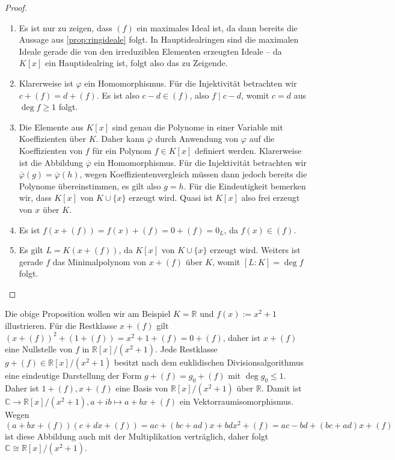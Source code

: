 \begin{proof}{\ }
    \begin{enumerate}
        \item Es ist nur zu zeigen, dass $(f)$ ein maximales Ideal ist, da dann bereits die Aussage aus \cref*{prop:ringideale} folgt. In Hauptidealringen sind die maximalen Ideale gerade die von den irreduziblen Elementen erzeugten Ideale -- da $K[x]$ ein Hauptidealring ist, folgt also das zu Zeigende.
        \item Klarerweise ist $\varphi$ ein Homomorphismus. Für die Injektivität betrachten wir $c + (f) = d + (f)$. Es ist also $c - d \in (f)$, also $f \mid c - d$, womit $c = d$ aus $\deg f\geq 1$ folgt.
        \item Die Elemente aus $K[x]$ sind genau die Polynome in einer Variable mit Koeffizienten über $K$. Daher kann $\overline{\varphi}$ durch Anwendung von $\varphi$ auf die Koeffizienten von $f$ für ein Polynom $f\in K[x]$ definiert werden. Klarerweise ist die Abbildung $\overline{\varphi}$ ein Homomorphismus. Für die Injektivität betrachten wir $\overline{\varphi}(g) = \overline{\varphi}(h)$, wegen Koeffizientenvergleich müssen dann jedoch bereits die Polynome übereinstimmen, es gilt also $g = h$. Für die Eindeutigkeit bemerken wir, dass $K[x]$ von $K \cup \{ x \}$ erzeugt wird. Quasi ist $K[x]$ also frei erzeugt von $x$ über $K$.
        \item Es ist $f(x + (f)) = f(x) + (f) = 0 + (f) = 0_L$, da $f(x) \in (f)$.
        \item Es gilt $L = K(x + (f))$, da $K[x]$ von $K \cup \{x\}$ erzeugt wird. Weiters ist gerade $f$ das Minimalpolynom von $x + (f)$ über $K$, womit $[L : K] = \deg f$ folgt.
    \end{enumerate}
\end{proof}

\begin{example}
    Die obige Proposition wollen wir am Beispiel $K=\mathbb{R}$ und $f(x):=x^2+1$ illustrieren. Für die Restklasse $x+(f)$ gilt $(x+(f))^2+(1+(f))=x^2+1+(f)=0+(f)$, daher ist $x+(f)$ eine Nullstelle von $f$ in $\mathbb{R}[x]/(x^2+1)$. Jede Restklasse $g+(f)\in\mathbb{R}[x]/(x^2+1)$ besitzt nach dem euklidischen Divisionsalgorithmus eine eindeutige Darstellung der Form $g+(f)=g_0+(f)$ mit $\deg g_0\le 1$. Daher ist $1+(f),x+(f)$ eine Basis von $\mathbb{R}[x]/(x^2+1)$ über $\mathbb{R}$. Damit ist $\mathbb{C}\to \mathbb{R}[x]/(x^2+1), a+ib\mapsto a+bx+(f)$ ein Vektorraumisomorphismus. Wegen $(a+bx+(f))(c+dx+(f))=ac+(bc+ad)x+bdx^2+(f)=ac-bd+(bc+ad)x+(f)$ ist diese Abbildung auch mit der Multiplikation verträglich, daher folgt $\mathbb{C}\cong \mathbb{R}[x]/(x^2+1)$.
\end{example}

